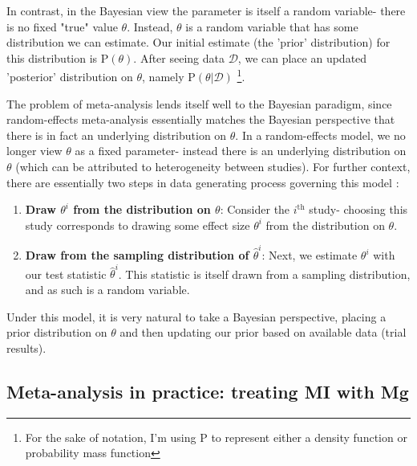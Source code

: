 \documentclass[fleqn,10pt]{SelfArx} %
\begin{document}
In contrast, in the Bayesian view the parameter is itself a random variable- there is no fixed "true" value $\theta$. Instead, $\theta$ is a random variable that has some distribution we can estimate. Our initial estimate (the 'prior' distribution) for this distribution is P$(\theta)$. After seeing data $\mathcal{D}$, we can place an updated 'posterior' distribution on $\theta$, namely P$(\theta | \mathcal{D})$ \footnote{For the sake of notation, I'm using P to represent either a density function or probability mass function}.

The problem of meta-analysis lends itself well to the Bayesian paradigm, since random-effects meta-analysis essentially matches the Bayesian perspective that there is in fact an underlying distribution on $\theta$. In a random-effects model, we no longer view $\theta$ as a fixed parameter- instead there is an underlying distribution on $\theta$ (which can be attributed to heterogeneity between studies). For further context, there are essentially two steps in data generating process governing this model \cite{Hedges}:
\begin{enumerate}
\item \textbf{Draw $\theta^i$ from the distribution on $\theta$}: Consider the $i^{\textrm{th}}$ study- choosing this study corresponds to drawing some effect size $\theta^i$ from the distribution on $\theta$.
\item \textbf{Draw from the sampling distribution of $\hat{\theta}^i$}: Next, we estimate $\theta^i$ with our test statistic $\hat{\theta}^i$. This statistic is itself drawn from a sampling distribution, and as such is a random variable.
\end{enumerate}
Under this model, it is very natural to take a Bayesian perspective, placing a prior distribution on $\theta$ and then updating our prior based on available data (trial results).

\subsection*{Meta-analysis in practice: treating MI with Mg}
\end{document}
